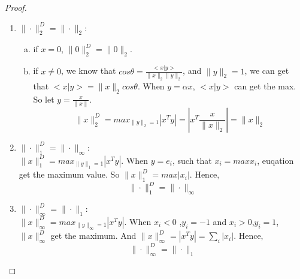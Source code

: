 \documentclass[a4paper]{article}
\begin{document}
\begin{description}
  \begin{proof}\
    \begin{enumerate}[1)]
      \item $\|\cdot\|_2^D=\|\cdot\|_2$:
      \begin{enumerate}[(a)]
        \item if $x=0$, $\|0\|_2^D=\|0\|_2$.
        \item if $x\ne 0$, we know that $cos\theta=\frac{<x|y>}{\|x\|_{2}\|y\|_{2}}$, and $\|y\|_{2}=1$, we can get that $<x|y>=\|x\|_{2}cos\theta$. When $y=\alpha x$, $<x|y>$ can get the max. So let $y=\frac{x}{\|x\|}$.
          $$\|x\|_{2}^{D}=max_{\|y\|_{2}=1}|x^{T}y|=\left|x^{T}\frac{x}{\|x\|_{2}}\right|=\|x\|_2$$
      \end{enumerate}
      \item $\|\cdot\|_1^D=\|\cdot\|_\infty$:\\
        $\|x\|_{1}^{D}=max_{\|y\|_{1}=1}|x^{T}y|$. When $y=e_{i}$, such that $x_{i}=max{x_{i}}$, euqation get the maximum value. So $\|x\|_{1}^{D}=max|x_{i}|$. Hence, $$\|\cdot\|_1^D=\|\cdot\|_\infty$$
      \item $\|\cdot\|_\infty^D=\|\cdot\|_1$:\\
        $\|x\|_{\infty}^{D}=max_{\|y\|_{\infty}=1}|x^{T}y|$. When $x_{i}<0$ ,$y_{i}=-1$ and $x_{i}>0$,$y_{i}=1$, $\|x\|_{\infty}^{D}$ get the maximum. And $\|x\|_{\infty}^{D}=|x^{T}y|=\sum_{i}|x_{i}|$. Hence, $$\|\cdot\|_\infty^D=\|\cdot\|_1$$
    \end{enumerate}
  \end{proof}

\end{description}
\end{document}
